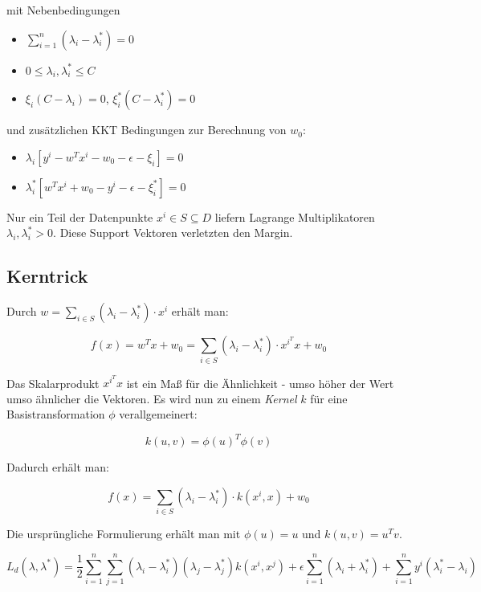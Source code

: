 \documentclass{report}
\begin{document}
mit Nebenbedingungen\\
\vspace*{-1.5em}
\begin{itemize}
  \item $\sum_{i=1}^n(\lambda_i - \lambda_i^*) = 0$
  \item $0\leq \lambda_i, \lambda_i^*\leq C$
  \item $\xi_i(C-\lambda_i) = 0$, $\xi_i^*(C - \lambda_i^*) = 0$
\end{itemize}

und zusätzlichen KKT Bedingungen zur Berechnung von $w_0$:\\
\vspace*{-1.5em}
\begin{itemize}
  \item $\lambda_i[y^i - w^Tx^i - w_0 - \epsilon - \xi_i] = 0$
  \item $\lambda_i^*[w^Tx^i + w_0 - y^i - \epsilon - \xi_i^*] = 0$
\end{itemize}

Nur ein Teil der Datenpunkte $x^i \in S\subseteq D$ liefern Lagrange Multiplikatoren $\lambda_i, \lambda_i^* > 0$. Diese
Support Vektoren verletzten den Margin.

\subsection{Kerntrick}

Durch $w = \sum_{i\in S}(\lambda_i - \lambda_i^*)\cdot x^i$ erhält man:

$$f(x) = w^Tx + w_0 = \sum_{i\in S}(\lambda_i - \lambda_i^*)\cdot x^{i^T}x + w_0$$

Das Skalarprodukt $x^{i^T}x$ ist ein Maß für die Ähnlichkeit - umso höher der Wert umso ähnlicher die Vektoren.
Es wird nun zu einem \textit{Kernel} $k$ für eine Basistransformation $\phi$ verallgemeinert:

$$k(u, v) = \phi(u)^T\phi(v)$$

Dadurch erhält man:

$$f(x) = \sum_{i\in S}(\lambda_i - \lambda_i^*)\cdot k(x^i, x) + w_0$$

Die ursprüngliche Formulierung erhält man mit $\phi(u) = u$ und $k(u, v) = u^Tv$.

$$L_d(\lambda, \lambda^*) = \frac{1}{2}\sum_{i=1}^n\sum_{j=1}^n(\lambda_i - \lambda_i^*)(\lambda_j - \lambda_j^*)
k(x^i, x^j) + \epsilon\sum_{i=1}^n(\lambda_i + \lambda_i^*) + \sum_{i=1}^ny^i(\lambda_i^* - \lambda_i)$$
\end{document}
